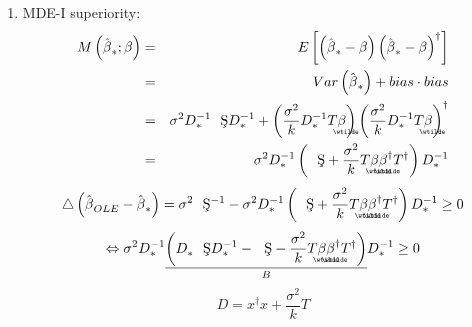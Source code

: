 \documentclass{article}
\begin{document}
\begin{enumerate}
\item MDE-I superiority:%
\begin{eqnarray*}
M\left( \hat{\beta}_{\ast };\beta \right) &=&E\left[ \left( \hat{\beta}%
_{\ast }-\beta \right) \left( \hat{\beta}_{\ast }-\beta \right) ^{\dagger }%
\right] \\
&=&Var\left( \hat{\beta}_{\ast }\right) +bias\cdot bias \\
&=&\sigma ^{2}D_{\ast }^{-1}\text{\c{S}}D_{\ast }^{-1}+\left( \frac{\sigma
^{2}}{k}D_{\ast }^{-1}T%
\underaccent{\wtilde}{\beta}%
\right) \left( \frac{\sigma ^{2}}{k}D_{\ast }^{-1}T%
\underaccent{\wtilde}{\beta}%
\right) ^{\dagger } \\
&=&\sigma ^{2}D_{\ast }^{-1}\left( \text{\c{S}}+\frac{\sigma ^{2}}{k}T%
\underaccent{\wtilde}{\beta}%
\underaccent{\wtilde}{\beta}%
^{\dagger }T^{\dagger }\right) D_{\ast }^{-1}
\end{eqnarray*}%
\begin{equation*}
\bigtriangleup \left( \hat{\beta}_{OLE}-\hat{\beta}_{\ast }\right) =\sigma
^{2}\text{\c{S}}^{-1}-\sigma ^{2}D_{\ast }^{-1}\left( \text{\c{S}}+\frac{%
\sigma ^{2}}{k}T%
\underaccent{\wtilde}{\beta}%
\underaccent{\wtilde}{\beta}%
^{\dagger }T^{\dagger }\right) D_{\ast }^{-1}\geq 0
\end{equation*}%
\begin{equation*}
\Leftrightarrow \sigma ^{2}D_{\ast }^{-1}\underset{B}{\underline{\left(
D_{\ast }^{{}}\text{\c{S}}D_{\ast }^{-1}-\text{\c{S}}-\frac{\sigma ^{2}}{k}T%
\underaccent{\wtilde}{\beta}%
\underaccent{\wtilde}{\beta}%
^{\dagger }T^{\dagger }\right) }}D_{\ast }^{-1}\geq 0
\end{equation*}%
\begin{equation*}
D=x^{\dagger }x+\frac{\sigma ^{2}}{k}T

\end{equation*}
\end{enumerate}
\end{document}
